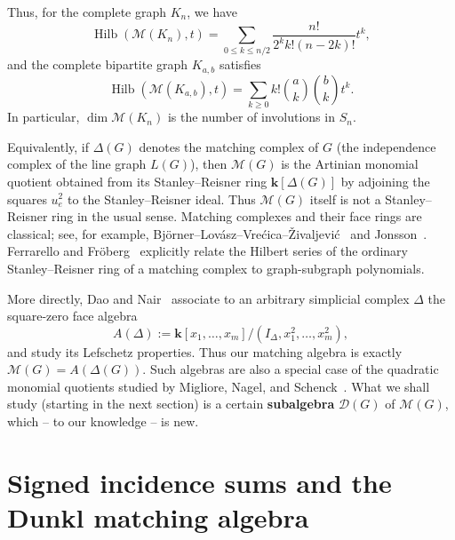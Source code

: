 \documentclass[12pt]{amsart}
\theoremstyle{definition}
\newtheorem{example}[theorem]{Example}
\theoremstyle{remark}
\newcommand{\kk}{\mathbf{k}}
\newcommand{\Hilb}{\operatorname{Hilb}}
\begin{document}
Thus, for the complete graph $K_n$, we have
\[
 \Hilb(\mathcal M(K_n),t)
 =\sum_{0\leq k\leq n/2}
 \frac{n!}{2^k k!(n-2k)!}t^k,
\]
and the complete bipartite graph $K_{a,b}$ satisfies
\[
 \Hilb(\mathcal M(K_{a,b}),t)
 =\sum_{k\geq0}k!\binom ak\binom bk t^k.
\]
In particular, $\dim\mathcal M(K_n)$ is the number of involutions in $S_n$.

Equivalently, if $\Delta(G)$ denotes the matching complex of $G$ (the
independence complex of the line graph $L(G)$), then $\mathcal M(G)$ is the
Artinian monomial quotient obtained from its Stanley--Reisner ring
$\kk[\Delta(G)]$ by adjoining the squares $u_e^2$ to the Stanley--Reisner
ideal.  Thus $\mathcal M(G)$ itself is not a Stanley--Reisner ring in the
usual sense.  Matching complexes and their face rings are classical; see, for
example, Bj\"orner--Lov\'asz--Vre\'cica--\v{Z}ivaljevi\'c~\cite{BLVZ}
and Jonsson~\cite[Chapter~5]{Jonsson}.  Ferrarello and Fr\"oberg~\cite{FF}
explicitly relate the Hilbert series of the ordinary Stanley--Reisner ring of
a matching complex to graph-subgraph polynomials.

More directly, Dao and Nair~\cite{DaoNair} associate to an arbitrary
simplicial complex $\Delta$ the square-zero face algebra
\[
 A(\Delta):=\kk[x_1,\ldots,x_m]/(I_\Delta,x_1^2,\ldots,x_m^2),
\]
and study its Lefschetz properties.  Thus our matching algebra is exactly
$\mathcal M(G)=A(\Delta(G))$.  Such algebras are also a special case of the
quadratic monomial quotients studied by Migliore, Nagel, and
Schenck~\cite{MNS}.  What we shall study (starting in the next section) is
a certain \textbf{subalgebra} $\mathcal D(G)$ of $\mathcal M(G)$,
which -- to our knowledge -- is new.


\section{Signed incidence sums and the Dunkl matching algebra}
\end{document}
